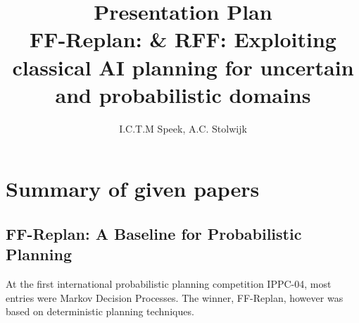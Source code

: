 \documentclass[runningheads,a4paper]{llncs}
\begin{document}
\mainmatter%

\title{Presentation Plan\\
FF-Replan: \& RFF\@: Exploiting classical AI planning for uncertain and probabilistic domains}


\author{I.C.T.M Speek, A.C. Stolwijk}

%



\maketitle

\section{Summary of given papers}

\subsection{FF-Replan: A Baseline for Probabilistic Planning}

At the first international probabilistic planning competition IPPC-04, most entries were Markov Decision Processes. The winner, FF-Replan, however was based on deterministic planning techniques.
\end{document}
